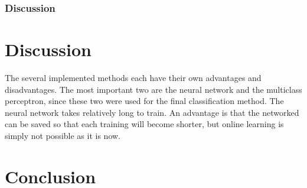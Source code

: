 \documentclass[11pt]{article}
\begin{document}
\subsubsection{Discussion}



\section{Discussion}
The several implemented methods each have their own advantages and disadvantages. The most important two are the neural network and the multiclass perceptron, since these two were used for the final classification method. The neural network takes relatively long to train. An advantage is that the networked can be saved so that each training will become shorter, but online learning is simply not possible as it is now. 


\section{Conclusion}
\end{document}
